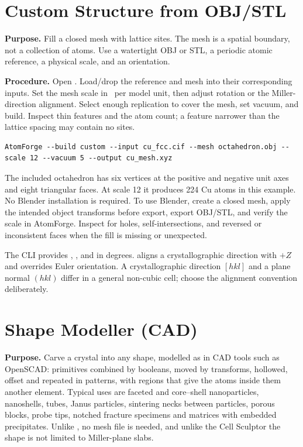 \section{Custom Structure from OBJ/STL}
\textbf{Purpose.} Fill a closed mesh with lattice sites. The mesh is a spatial boundary, not a collection of atoms. Use a watertight OBJ or STL, a periodic atomic reference, a physical scale, and an orientation.

\textbf{Procedure.} Open . Load/drop the reference and mesh into their corresponding inputs. Set the mesh scale in \angstrom\ per model unit, then adjust rotation or the Miller-direction alignment. Select enough replication to cover the mesh, set vacuum, and build. Inspect thin features and the atom count; a feature narrower than the lattice spacing may contain no sites.

\begin{lstlisting}
AtomForge --build custom --input cu_fcc.cif --mesh octahedron.obj --scale 12 --vacuum 5 --output cu_mesh.xyz
\end{lstlisting}
The included octahedron has six vertices at the positive and negative unit axes and eight triangular faces. At scale 12 it produces 224 Cu atoms in this example. No Blender installation is required. To use Blender, create a closed mesh, apply the intended object transforms before export, export OBJ/STL, and verify the scale in AtomForge. Inspect for holes, self-intersections, and reversed or inconsistent faces when the fill is missing or unexpected.

The CLI provides , , and  in degrees.  aligns a crystallographic direction with $+Z$ and overrides Euler orientation. A crystallographic direction $[hkl]$ and a plane normal $(hkl)$ differ in a general non-cubic cell; choose the alignment convention deliberately.

\section{Shape Modeller (CAD)}\label{sec:shape-modeller}
\textbf{Purpose.} Carve a crystal into any shape, modelled as in CAD tools such as OpenSCAD: primitives combined by booleans, moved by transforms, hollowed, offset and repeated in patterns, with regions that give the atoms inside them another element. Typical uses are faceted and core--shell nanoparticles, nanoshells, tubes, Janus particles, sintering necks between particles, porous blocks, probe tips, notched fracture specimens and matrices with embedded precipitates. Unlike , no mesh file is needed, and unlike the Cell Sculptor the shape is not limited to Miller-plane slabs.

